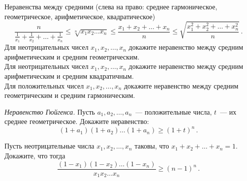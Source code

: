 


\begin{problems}



\item
Неравенства между средними (слева на право: среднее гармоническое,
геометрическое, арифметическое, квадратическое)
\[
    \frac{n}{\frac{1}{x_{1}} + \frac{1}{x_{2}} + \ldots + \frac{1}{x_{n}}}
\leq
    \sqrt[n]{x_{1} x_{2} \ldots x_{n}}
\leq
    \frac{x_{1}+x_{2}+\dots+x_{n}}{n}
\leq
    \sqrt{\frac{x_{1}^2+x_{2}^2+\dots+x_{n}^2}{n}}
\, . \]
\subproblem
Для неотрицательных чисел $x_{1}, x_{2}, \ldots, x_{n}$ докажите неравенство
между средним арифметическим и средним геометрическим.
\\
\subproblem
Для неотрицательных чисел $x_{1}, x_{2}, \ldots,x_{n}$ докажите неравенство
между средним арифметическим и средним квадратичным.
\\
\subproblem
Для положительных чисел $x_{1}, x_{2}, \ldots,x_{n}$ докажите неравенство
между средним геометрическим и средним гармоническим.

\item
\emph{Неравенство Гюйгенса.}
Пусть $a_{1}, a_{2}, \ldots, a_{n}$~--- положительные числа,
$t$~--- их среднее геометрическое.
Докажите неравенство:
\[
    (1 + a_{1}) (1 + a_{2}) \ldots (1 + a_{n})
\geq
    (1 + t)^{n}
\, . \]

\item
Пусть неотрицательные числа $x_{1}, x_{2}, \ldots, x_{n}$ таковы, что
$x_{1} + x_{2} + \ldots + x_{n} = 1$.
Докажите, что тогда
\[
    \frac
        {(1 - x_{1}) (1 - x_{2}) \ldots (1 - x_{n})}
        {x_{1} x_{2} \ldots x_{n}}
\geq
    (n - 1)^{n}
\, . \]


\end{problems}
